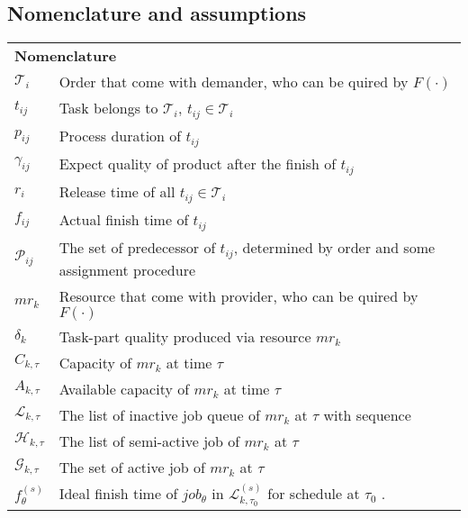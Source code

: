 \subsection{Nomenclature and assumptions} %
\label{ssub:assumptions_nomenclature}
\begin{table}[htbp]
  \scriptsize
\begin{tabularx}{\textwidth}{|lX|}
    \hline
    \multicolumn{2}{|l|}{\multirow{2}[0]{*}{\textbf{Nomenclature}}} \\
    \multicolumn{2}{|l|}{} \\
    $\mathcal{T}_i$ & Order that come with demander, who can be quired by $F(\cdot)$ \\
    $t_{ij}$ & Task belongs to $\mathcal{T}_i$, $t_{ij}\in\mathcal{T}_i$ \\
    $p_{ij}$ & Process duration of $t_{ij}$\\
    $\gamma_{ij}$ & Expect quality of product after the finish of $t_{ij}$\\
    $r_i$ & Release time of all $t_{ij}\in\mathcal{T}_i$\\
    $f_{ij}$ & Actual finish time of $t_{ij}$ \\
    $\mathcal{P}_{ij}$ & The set of predecessor of $t_{ij}$, determined by order and some assignment procedure\\
    $mr_k$ & Resource that come with provider, who can be quired by $F(\cdot)$ \\
    $\delta_k$ & Task-part quality produced via resource $mr_k$ \\
    $C_{k,\tau}$ & Capacity of $mr_k$ at time $\tau$\\
    $A_{k,\tau}$ & Available capacity of $mr_k$ at time $\tau$\\
    $\mathcal{L}_{k,\tau}$ & The list of inactive job queue of $mr_k$ at $\tau$ with sequence\\
    $\mathcal{H}_{k,\tau}$ & The list of semi-active job of $mr_k$ at $\tau$ \\
    $\mathcal{G}_{k,\tau}$ & The set of active job of $mr_k$ at $\tau$ \\
    $f^{(s)}_\theta$ & Ideal finish time of $job_\theta$ in $\mathcal{L}^{(s)}_{k,\tau_0}$ for schedule at $\tau_0$ . \\

\end{tabularx}
\end{table}

